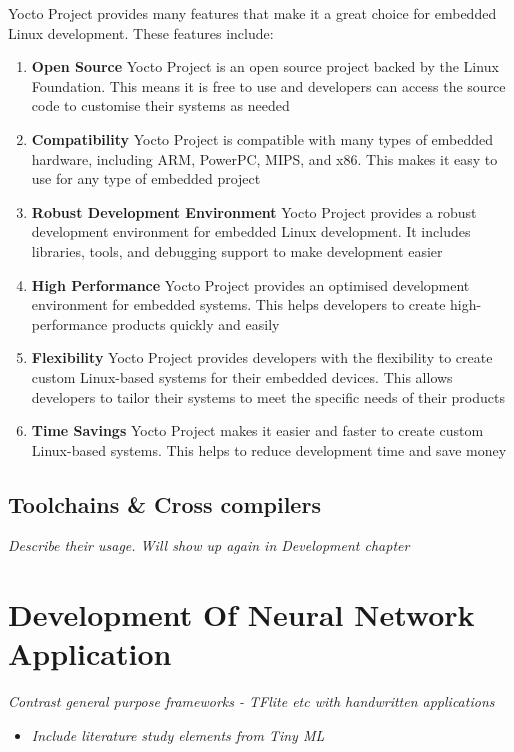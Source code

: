 Yocto Project provides many features that make it a great choice for embedded Linux development. These features include:

\begin{enumerate}
	\item \textbf{Open Source} Yocto Project is an open source project backed by the Linux Foundation. This means it is free to use and developers can access the source code to customise their systems as needed
	\item \textbf{Compatibility} Yocto Project is compatible with many types of embedded hardware, including ARM, PowerPC, MIPS, and x86. This makes it easy to use for any type of embedded project
	\item \textbf{Robust Development Environment} Yocto Project provides a robust development environment for embedded Linux development. It includes libraries, tools, and debugging support to make development easier
	\item \textbf{High Performance} Yocto Project provides an optimised development environment for embedded systems. This helps developers to create high-performance products quickly and easily
	\item \textbf{Flexibility} Yocto Project provides developers with the flexibility to create custom Linux-based systems for their embedded devices. This allows developers to tailor their systems to meet the specific needs of their products
	\item \textbf{Time Savings} Yocto Project makes it easier and faster to create custom Linux-based systems. This helps to reduce development time and save money
\end{enumerate}

\subsection[SDKs \& Compiler Toolchains]{Toolchains \& Cross compilers}
\textit{Describe their usage. Will show up again in Development chapter}

\section[Development of Neural Network Application]{Development Of Neural Network Application}
\textit{Contrast general purpose frameworks - TFlite etc with handwritten applications}

\begin{itemize}
	\item \textit{Include literature study elements from Tiny ML}
\end{itemize}

